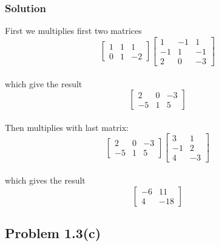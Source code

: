 \documentclass{article}
\begin{document}
            \subsubsection{Solution}
                First we multiplies first two matrices
                \begin{equation*}
                    \begin{bmatrix}1 & 1 & 1 \\ 0 & 1 & -2\end{bmatrix}
                    \begin{bmatrix}1 & -1 & 1 \\ -1 & 1 & -1 \\ 2 & 0 & -3\end{bmatrix}
                \end{equation*}
                \\
                which give the result
                \begin{equation*}
                    \begin{bmatrix}2 & 0 & -3 \\ -5 & 1 & 5\end{bmatrix}
                \end{equation*}
                \\
                Then multiplies with last matrix:
                \begin{equation*}
                    \begin{bmatrix}2 & 0 & -3 \\ -5 & 1 & 5\end{bmatrix}
                    \begin{bmatrix}3 & 1 \\ -1 & 2 \\ 4 & -3\end{bmatrix}
                \end{equation*}
                \\
                which gives the result
                \begin{equation*}
                    \begin{bmatrix}-6 & 11 \\ 4 & -18\end{bmatrix}
                \end{equation*}

        \subsection{Problem 1.3(c)}
\end{document}
